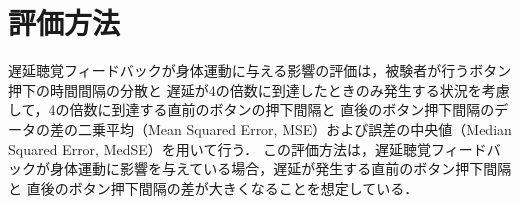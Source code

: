 \section{評価方法}
遅延聴覚フィードバックが身体運動に与える影響の評価は，被験者が行うボタン押下の時間間隔の分散と
遅延が4の倍数に到達したときのみ発生する状況を考慮して，4の倍数に到達する直前のボタンの押下間隔と
直後のボタン押下間隔のデータの差の二乗平均（Mean Squared Error, MSE）および誤差の中央値（Median Squared Error, MedSE）を用いて行う．
この評価方法は，遅延聴覚フィードバックが身体運動に影響を与えている場合，遅延が発生する直前のボタン押下間隔と
直後のボタン押下間隔の差が大きくなることを想定している．
